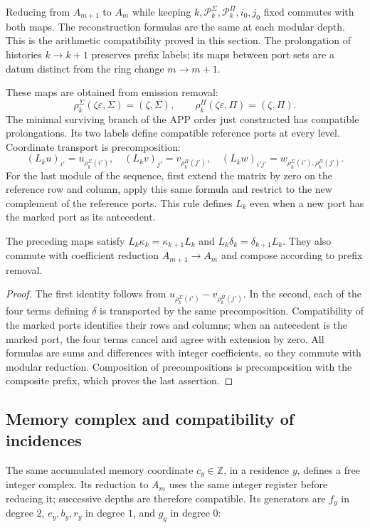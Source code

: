 Reducing from \(A_{m+1}\) to \(A_m\) while keeping \(k,\mathscr P_k^\Sigma,\mathscr P_k^\Pi,i_0,j_0\) fixed commutes with both maps. The reconstruction formulas are the same at each modular depth. This is the arithmetic compatibility proved in this section. The prolongation of histories \(k\to k+1\) preserves prefix labels; its maps between port sets are a datum distinct from the ring change \(m\to m+1\).

These maps are obtained from emission removal:
\[
\rho_k^\Sigma(\zeta\varepsilon,\Sigma)=(\zeta,\Sigma),\qquad
\rho_k^\Pi(\zeta\varepsilon,\Pi)=(\zeta,\Pi).
\]
The minimal surviving branch of the APP order just constructed has compatible prolongations. Its two labels define compatible reference ports at every level. Coordinate transport is precomposition:
\[
(L_ku)_{i'}=u_{\rho_k^\Sigma(i')},\quad
(L_kv)_{j'}=v_{\rho_k^\Pi(j')},\quad
(L_kw)_{i'j'}=w_{\rho_k^\Sigma(i'),\rho_k^\Pi(j')}.
\]
For the last module of the sequence, first extend the matrix by zero on the reference row and column, apply this same formula and restrict to the new complement of the reference ports. This rule defines \(L_k\) even when a new port has the marked port as its antecedent.

\begin{proposition}
\label{hmtfg:base:iv:rectangular-natural}
The preceding maps satisfy
\(L_k\kappa_k=\kappa_{k+1}L_k\) and
\(L_k\delta_k=\delta_{k+1}L_k\).
They also commute with coefficient reduction
\(A_{m+1}\to A_m\) and compose according to prefix removal.
\end{proposition}
\begin{proof}
The first identity follows from \(u_{\rho_k^\Sigma(i')}-v_{\rho_k^\Pi(j')}\). In the second, each of the four terms defining \(\delta\) is transported by the same precomposition. Compatibility of the marked ports identifies their rows and columns; when an antecedent is the marked port, the four terms cancel and agree with extension by zero. All formulas are sums and differences with integer coefficients, so they commute with modular reduction. Composition of precompositions is precomposition with the composite prefix, which proves the last assertion.
\end{proof}

\subsection{Memory complex and compatibility of incidences}
The same accumulated memory coordinate \(c_y\in\mathbb Z\), in a residence \(y\), defines a free integer complex. Its reduction to \(A_m\) uses the same integer register before reducing it; successive depths are therefore compatible. Its generators are \(f_y\) in degree \(2\), \(e_y,b_y,r_y\) in degree \(1\), and \(g_y\) in degree \(0\):

